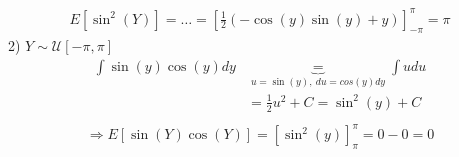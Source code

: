 \documentclass{article}
\begin{document}
\begin{align*}
E[\sin^2(Y)] = \dots = [\frac 1 2 (-\cos(y)\sin(y) + y) ]^{\pi}_{-\pi} = \pi
\end{align*}
2) $ Y \sim \mathcal{U}[-\pi, \pi] $
\begin{align*}
\int \sin(y)\cos(y)dy& \underbrace{=}_{u = \sin(y), \ du = cos(y)dy} \int u du \\
&= \frac 1 2 u^2 + C = \sin^2(y) + C \\
\end{align*}
\begin{align*}
\Rightarrow E[\sin(Y)\cos(Y)] = [\sin^2(y)]^{\pi}_{\pi} = 0 - 0 = 0
\end{align*}




\end{document}

